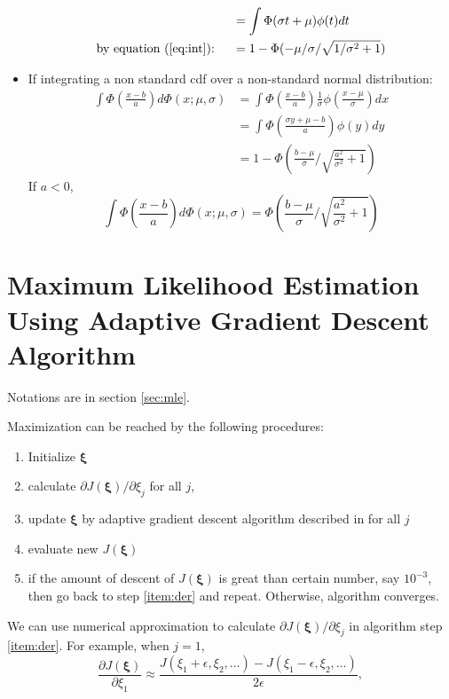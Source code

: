 \documentclass[12pt]{article}
\begin{document}
\begin{itemize}
\begin{align*}
    & = \int \Phi(\sigma t + \mu)\phi(t) dt \\
    \text{by equation (\ref{eq:int}): } \quad & = 1 -
    \Phi(-\mu/\sigma/\sqrt{1/\sigma^2+1})
  \end{align*}
\item If integrating a non standard cdf over a non-standard normal
  distribution:
  \begin{align}
    \int \Phi \left( \frac{x-b}{a} \right) d\Phi(x; \mu, \sigma) & = \int \Phi \left( \frac{x-b}{a} \right) \frac{1}{\sigma} \phi \left( \frac{x-\mu}{\sigma} \right) dx \nonumber\\
    &= \int \Phi \left( \frac{\sigma y + \mu - b}{a}  \right) \phi(y) dy \nonumber \\
    \label{eq:intg1}
    & = 1- \Phi \left( \frac{b-\mu}{\sigma} / \sqrt{\frac{a^2}{\sigma^2}+1} \right)
  \end{align}
  If $a < 0$,
  \begin{equation}
    \label{eq:intg2}
    \int \Phi \left( \frac{x-b}{a} \right) d\Phi(x; \mu, \sigma) = \Phi \left( \frac{b-\mu}{\sigma} / \sqrt{\frac{a^2}{\sigma^2}+1} \right)
  \end{equation}

\end{itemize}

\section{Maximum Likelihood Estimation Using Adaptive Gradient Descent Algorithm}

Notations are in section \ref{sec:mle}. 

Maximization can be reached by the following procedures:
\begin{enumerate}
\item Initialize $\bm \xi$
\item \label{item:der} calculate $\partial J(\bm \xi) / \partial
  \xi_j$ for all $j$,
\item update $\bm \xi$ by adaptive gradient descent algorithm 
described in \citet{ried1993} for all $j$
\item evaluate new $J(\bm \xi)$
\item if the amount of descent of $J ( \bm \xi)$ is great than certain
  number, say $10^{-3}$, then go back to step \ref{item:der} and
  repeat. Otherwise, algorithm converges.
\end{enumerate}

We can use numerical approximation to calculate $\partial J(\bm
\xi)/\partial \xi_j$ in algorithm step \ref{item:der}. For example, when $j = 1$, 
\begin{displaymath}
  \frac{\partial J(\bm \xi)}{\partial \xi_1} \approx \frac{J(\xi_1 + \epsilon, \xi_2, \ldots) - J(\xi_1 - \epsilon, \xi_2 , \ldots)}{2\epsilon}, 
\end{displaymath}
\end{document}
